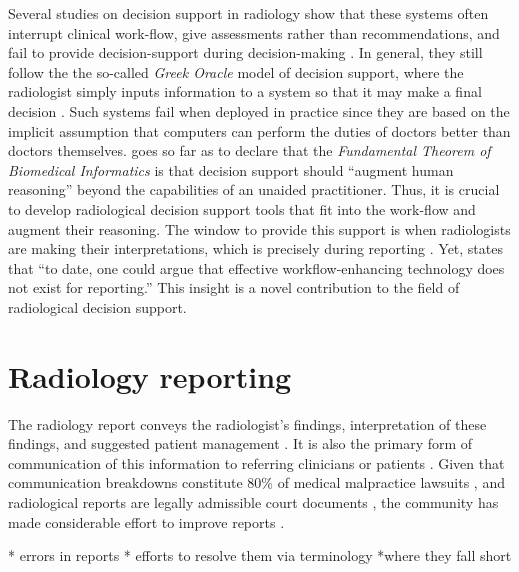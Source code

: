Several studies on decision support in radiology show that these systems often interrupt clinical  work-flow, give assessments rather than recommendations, and fail to provide decision-support during decision-making \cite{Kawamoto:2005gn,Morgan:2011ct}.
In general, they still follow the the so-called \emph{Greek Oracle} model of decision support, where the radiologist simply inputs information to a system so that it may make a final decision \cite{Miller:1990wg,Miller:1994cx}.
Such systems fail when deployed in practice since they are based on the implicit assumption that computers can perform the duties of doctors better than doctors themselves.
 goes so far as to declare that the \emph{Fundamental Theorem of Biomedical Informatics} is that decision support should ``augment human reasoning'' beyond the capabilities of an unaided practitioner.
Thus, it is crucial to develop radiological decision support tools that fit into the work-flow and augment their reasoning.
The window to provide this support is when radiologists are making their interpretations, which is precisely during reporting \cite{Noumeir:2006cb}.
Yet,  states that ``to date, one could argue that effective workflow-enhancing technology does not exist for reporting.''
This insight is a novel contribution to the field of radiological decision support.



\section{Radiology reporting}
The radiology report conveys the radiologist's findings, interpretation of these findings, and suggested patient management \cite{Langlotz:2015vq}.
It is also the primary form of communication of this information to referring clinicians or patients \cite{Sistrom:2005cx}.
Given that communication breakdowns constitute 80\% of medical malpractice lawsuits \cite{Levinson:1994ko}, and radiological reports are legally admissible court documents \cite{Oppenheim:2012tq}, the community has made considerable effort to improve reports \cite{Langlotz:2015vq}.

* errors in reports
* efforts to resolve them via terminology
*where they fall short

